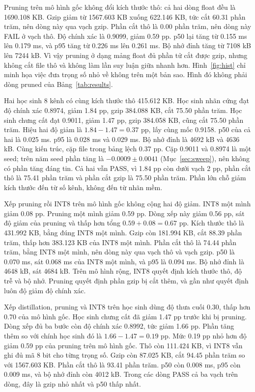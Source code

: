 \documentclass[13pt,a4paper]{article}
\begin{document}
Pruning trên mô hình gốc không đổi kích thước thô: cả hai dòng float đều là 1690.108 KB.
Gzip giảm từ 1567.603 KB xuống 622.146 KB, tức cắt 60.31 phần trăm, nên dòng này qua vạch gzip.
Phần cắt thô là 0.00 phần trăm, nên dòng này FAIL ở vạch thô.
Độ chính xác là 0.9099, giảm 0.59 pp.
p50 lại tăng từ 0.155 ms lên 0.179 ms, và p95 tăng từ 0.226 ms lên 0.261 ms.
Bộ nhớ đỉnh tăng từ 7108 kB lên 7244 kB.
Vì vậy pruning ở dạng mảng float đủ phần tử cắt được gzip, nhưng không cắt file thô và không làm lần suy luận giữa nhanh hơn.
Hình~\ref{fig:hist} chỉ minh họa việc đưa trọng số nhỏ về không trên một bản sao.
Hình đó không phải dòng pruned của Bảng~\ref{tab:results}.

Hai học sinh 8 kênh có cùng kích thước thô 415.612 KB.
Học sinh nhãn cứng đạt độ chính xác 0.8974, giảm 1.84 pp, gzip 384.088 KB, cắt 75.50 phần trăm.
Học sinh chưng cất đạt 0.9011, giảm 1.47 pp, gzip 384.058 KB, cũng cắt 75.50 phần trăm.
Hiệu hai độ giảm là \(1.84 - 1.47 = 0.37\) pp, lấy cùng mốc 0.9158.
p50 của cả hai là 0.025 ms.
p95 là 0.028 ms và 0.029 ms.
Bộ nhớ đỉnh là 4692 kB và 4636 kB.
Cùng kiến trúc, cặp file trong bảng lệch 0.37 pp.
Cặp 0.9011 và 0.8974 là một seed; trên năm seed phần tăng là \(-0.0009 \pm 0.0041\) (Mục~\ref{sec:sweep}), nên không có phần tăng đáng tin.
Cả hai vẫn PASS, vì 1.84 pp còn dưới vạch 2 pp, phần cắt thô là 75.41 phần trăm và phần cắt gzip là 75.50 phần trăm.
Phần lớn chỗ giảm kích thước đến từ số kênh, không đến từ nhãn mềm.

Xếp pruning rồi INT8 trên mô hình gốc không cộng hai độ giảm.
INT8 một mình giảm 0.08 pp.
Pruning một mình giảm 0.59 pp.
Dòng xếp này giảm 0.56 pp, sát độ giảm của pruning và thấp hơn tổng \(0.59 + 0.08 = 0.67\) pp.
Kích thước thô là 431.992 KB, bằng đúng INT8 một mình.
Gzip còn 181.994 KB, cắt 88.39 phần trăm, thấp hơn 383.123 KB của INT8 một mình.
Phần cắt thô là 74.44 phần trăm, bằng INT8 một mình, nên dòng này qua vạch thô và vạch gzip.
p50 là 0.070 ms, sát 0.068 ms của INT8 một mình, và p95 là 0.094 ms.
Bộ nhớ đỉnh là 4648 kB, sát 4684 kB.
Trên mô hình rộng, INT8 quyết định kích thước thô, độ trễ và bộ nhớ.
Pruning quyết định phần gzip bị cắt thêm, và gần như quyết định luôn độ giảm độ chính xác.

Xếp distillation, pruning và INT8 trên học sinh dùng độ thưa cuối 0.30, thấp hơn 0.70 của mô hình gốc.
Học sinh chưng cất đã giảm 1.47 pp trước khi bị pruning.
Dòng xếp đủ ba bước còn độ chính xác 0.8992, tức giảm 1.66 pp.
Phần tăng thêm so với chính học sinh đó là \(1.66 - 1.47 = 0.19\) pp.
Mức 0.19 pp nhỏ hơn độ giảm 0.59 pp của pruning trên mô hình gốc.
Thô còn 111.424 KB, vì INT8 vẫn ghi đủ mã 8 bit cho từng trọng số.
Gzip còn 87.025 KB, cắt 94.45 phần trăm so với 1567.603 KB.
Phần cắt thô là 93.41 phần trăm.
p50 còn 0.008 ms, p95 còn 0.009 ms, và bộ nhớ đỉnh còn 4012 kB.
Trong các dòng PASS cả ba vạch trên dòng, đây là gzip nhỏ nhất và p50 thấp nhất.
\end{document}
